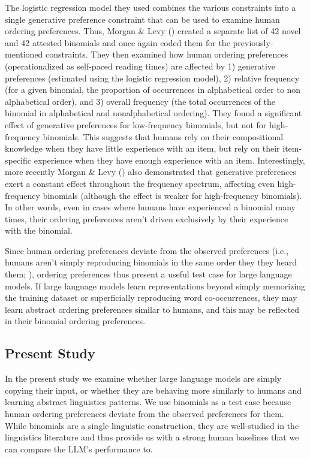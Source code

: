 \documentclass[
  12pt,
  letterpaper,
]{scrreport}
\begin{document}
The logistic regression model they used combines the various constraints
into a single generative preference constraint that can be used to
examine human ordering preferences. Thus, Morgan \& Levy
() created a
separate list of 42 novel and 42 attested binomials and once again coded
them for the previously-mentioned constraints. They then examined how
human ordering preferences (operationalized as self-paced reading times)
are affected by 1) generative preferences (estimated using the logistic
regression model), 2) relative frequency (for a given binomial, the
proportion of occurrences in alphabetical order to non alphabetical
order), and 3) overall frequency (the total occurrences of the binomial
in alphabetical and nonalphabetical ordering). They found a significant
effect of generative preferences for low-frequency binomials, but not
for high-frequency binomials. This suggests that humans rely on their
compositional knowledge when they have little experience with an item,
but rely on their item-specific experience when they have enough
experience with an item. Interestingly, more recently Morgan \& Levy
() also demonstrated that generative
preferences exert a constant effect throughout the frequency spectrum,
affecting even high-frequency binomials (although the effect is weaker
for high-frequency binomials). In other words, even in cases where
humans have experienced a binomial many times, their ordering
preferences aren't driven exclusively by their experience with the
binomial.

Since human ordering preferences deviate from the observed preferences
(i.e., humans aren't simply reproducing binomials in the same order they
they heard them; ),
ordering preferences thus present a useful test case for large language
models. If large language models learn representations beyond simply
memorizing the training dataset or superficially reproducing word
co-occurrences, they may learn abstract ordering preferences similar to
humans, and this may be reflected in their binomial ordering
preferences.

\subsection{Present Study}\label{present-study-1}

In the present study we examine whether large language models are simply
copying their input, or whether they are behaving more similarly to
humans and learning abstract linguistics patterns. We use binomials as a
test case because human ordering preferences deviate from the observed
preferences for them. While binomials are a single linguistic
construction, they are well-studied in the linguistics literature and
thus provide us with a strong human baselines that we can compare the
LLM's performance to.
\end{document}
